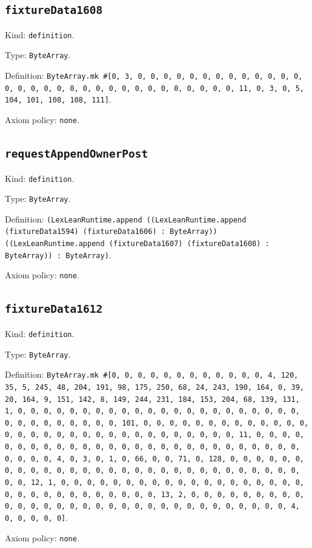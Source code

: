 \documentclass[11pt]{article}
\begin{document}
\subsection*{\texttt{fixtureData1608}}
\noindent Kind: \texttt{definition}.\par
\noindent Type: \texttt{ByteArray}.\par
\noindent Definition: \texttt{ByteArray.mk \#[0, 3, 0, 0, 0, 0, 0, 0, 0, 0, 0, 0, 0, 0, 0, 0, 0, 0, 0, 0, 0, 0, 0, 0, 0, 0, 0, 0, 0, 0, 0, 0, 0, 11, 0, 3, 0, 5, 104, 101, 108, 108, 111]}.\par
\noindent Axiom policy: \texttt{none}.\par
\subsection*{\texttt{requestAppendOwnerPost}}
\noindent Kind: \texttt{definition}.\par
\noindent Type: \texttt{ByteArray}.\par
\noindent Definition: \texttt{(LexLeanRuntime.append ((LexLeanRuntime.append (fixtureData1594) (fixtureData1606) : ByteArray)) ((LexLeanRuntime.append (fixtureData1607) (fixtureData1608) : ByteArray)) : ByteArray)}.\par
\noindent Axiom policy: \texttt{none}.\par
\subsection*{\texttt{fixtureData1612}}
\noindent Kind: \texttt{definition}.\par
\noindent Type: \texttt{ByteArray}.\par
\noindent Definition: \texttt{ByteArray.mk \#[0, 0, 0, 0, 0, 0, 0, 0, 0, 0, 0, 0, 4, 120, 35, 5, 245, 48, 204, 191, 98, 175, 250, 68, 24, 243, 190, 164, 0, 39, 20, 164, 9, 151, 142, 8, 149, 244, 231, 184, 153, 204, 68, 139, 131, 1, 0, 0, 0, 0, 0, 0, 0, 0, 0, 0, 0, 0, 0, 0, 0, 0, 0, 0, 0, 0, 0, 0, 0, 0, 0, 0, 0, 0, 0, 0, 0, 101, 0, 0, 0, 0, 0, 0, 0, 0, 0, 0, 0, 0, 0, 0, 0, 0, 0, 0, 0, 0, 0, 0, 0, 0, 0, 0, 0, 0, 0, 0, 0, 11, 0, 0, 0, 0, 0, 0, 0, 0, 0, 0, 0, 0, 0, 0, 0, 0, 0, 0, 0, 0, 0, 0, 0, 0, 0, 0, 0, 0, 0, 0, 0, 4, 0, 3, 0, 1, 0, 66, 0, 0, 71, 0, 128, 0, 0, 0, 0, 0, 0, 0, 0, 0, 0, 0, 0, 0, 0, 0, 0, 0, 0, 0, 0, 0, 0, 0, 0, 0, 0, 0, 0, 0, 0, 0, 12, 1, 0, 0, 0, 0, 0, 0, 0, 0, 0, 0, 0, 0, 0, 0, 0, 0, 0, 0, 0, 0, 0, 0, 0, 0, 0, 0, 0, 0, 0, 0, 0, 13, 2, 0, 0, 0, 0, 0, 0, 0, 0, 0, 0, 0, 0, 0, 0, 0, 0, 0, 0, 0, 0, 0, 0, 0, 0, 0, 0, 0, 0, 0, 0, 0, 4, 0, 0, 0, 0, 0]}.\par
\noindent Axiom policy: \texttt{none}.\par
\end{document}
